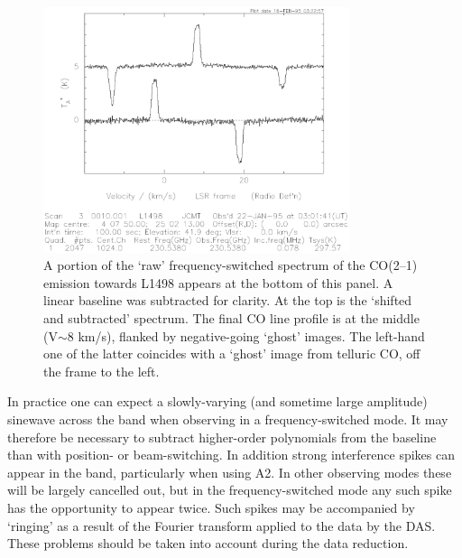 \documentclass[11pt,twoside]{starlink}
\begin{document}
\begin{figure}[htb]
\centering
\includegraphics[width=0.8\textwidth]{sc8_fsw_reduction}
\caption[Reducing frequency-switched data]
{\small{A portion of the `raw' frequency-switched spectrum of the CO(2--1)
emission towards L1498 appears at the bottom of this panel. A linear baseline
was subtracted for clarity. At the top is the `shifted and subtracted'
spectrum. The final CO line profile is at the middle (V$\sim 8$ km/s), flanked
by negative-going `ghost' images. The left-hand one of the latter coincides
with a `ghost' image from telluric CO, off the frame to the left.
}}
\label{fig:fsw_reduction}
\end{figure}

In practice one can expect a slowly-varying (and sometime large
amplitude) sinewave across the band when observing in a
frequency-switched mode. It may therefore be necessary to subtract
higher-order polynomials from the baseline than with position- or
beam-switching. In addition strong interference spikes can appear in
the band, particularly when using A2. In other observing modes these
will be largely cancelled out, but in the frequency-switched mode any
such spike has the opportunity to appear twice. Such spikes may be
accompanied by `ringing' as a result of the Fourier transform applied
to the data by the DAS. These problems should be taken into account
during the data reduction.
\end{document}
